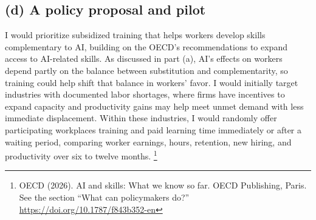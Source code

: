 \documentclass[12pt]{article}
\begin{document}
\subsection*{(d) A policy proposal and pilot}
I would prioritize subsidized training that helps workers develop skills complementary to AI, building on the OECD’s recommendations to expand access to AI-related skills. As discussed in part (a), AI’s effects on workers depend partly on the balance between substitution and complementarity, so training could help shift that balance in workers’ favor. I would initially target industries with documented labor shortages, where firms have incentives to expand capacity and productivity gains may help meet unmet demand with less immediate displacement. Within these industries, I would randomly offer participating workplaces training and paid learning time immediately or after a waiting period, comparing worker earnings, hours, retention, new hiring, and productivity over six to twelve months. \footnote{OECD (2026). AI and skills: What we know so far. OECD Publishing, Paris. See the section “What can policymakers do?” \href{https://doi.org/10.1787/f843b352-en}{https://doi.org/10.1787/f843b352-en}}
\end{document}
